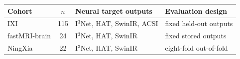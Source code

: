 \begin{tabular}{lcll}
\toprule
Cohort & $n$ & Neural target outputs & Evaluation design \\
\midrule
IXI & 115 & I$^3$Net, HAT, SwinIR, ACSI & fixed held-out outputs \\
fastMRI-brain & 24 & I$^3$Net, HAT, SwinIR & fixed stored outputs \\
NingXia & 22 & I$^3$Net, HAT, SwinIR & eight-fold out-of-fold \\
\bottomrule
\end{tabular}
